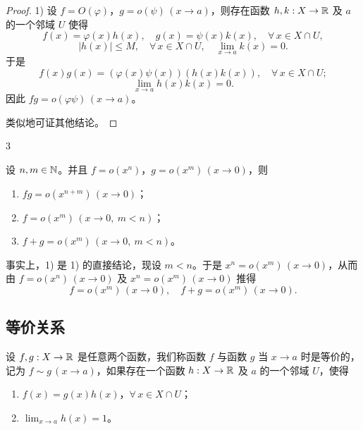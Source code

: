 \begin{proof}

1) 设 $f=O(\varphi)$，$g=o(\psi)\,(x\to a)$，则存在函数 $h,k:X\to\mathbb{R}$ 及 $a$ 的一个邻域 $U$ 使得
\[f(x)=\varphi(x)h(x),\quad g(x)=\psi(x)k(x),\quad \forall\,x\in X\cap U,\]
\[|h(x)|\leqslant M,\quad \forall\,x\in X\cap U,\quad \lim_{x\to a}k(x)=0.\]
于是
\[f(x)g(x)=(\varphi(x)\psi(x))(h(x)k(x)),\quad \forall\,x\in X\cap U;\]
\[\lim_{x\to a}h(x)k(x)=0.\]
因此 $fg=o(\varphi\psi)\,(x\to a)$。

类似地可证其他结论。

\end{proof}

\begin{sourceexample}{3}

设 $n,m\in\mathbb{N}$。并且 $f=o(x^n)$，$g=o(x^m)\,(x\to0)$，则

\begin{enumerate}[label=\arabic{enumi})]
\item $fg=o(x^{n+m})\,(x\to0)$；
\item $f=o(x^m)\,(x\to0,\ m<n)$；
\item $f+g=o(x^m)\,(x\to0,\ m<n)$。
\end{enumerate}

事实上，1) 是 1) 的直接结论，现设 $m<n$。于是 $x^n=o(x^m)\,(x\to0)$，从而由 $f=o(x^n)\,(x\to0)$ 及 $x^n=o(x^m)\,(x\to0)$ 推得
\[f=o(x^m)\,(x\to0),\quad f+g=o(x^m)\,(x\to0).\]

\end{sourceexample}

\subsection{等价关系}
	\label{sec:8-1-3}

\begin{mydef*}{}

设 $f,g:X\to\mathbb{R}$ 是任意两个函数，我们称函数 $f$ 与函数 $g$ 当 $x\to a$ 时是等价的，记为 $f\sim g\,(x\to a)$，如果存在一个函数 $h:X\to\mathbb{R}$ 及 $a$ 的一个邻域 $U$，使得

\begin{enumerate}[label=\arabic{enumi})]
\item $f(x)=g(x)h(x)$，$\forall\,x\in X\cap U$；
\item $\displaystyle\lim_{x\to a}h(x)=1$。
\end{enumerate}

\end{mydef*}

